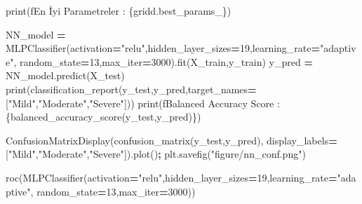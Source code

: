 \documentclass[12pt,twoside]{deuthesis}
\newenvironment{Shaded}{\begin{snugshade}}{\end{snugshade}}
\newcommand{\BuiltInTok}[1]{#1}
\newcommand{\DecValTok}[1]{\textcolor[rgb]{0.00,0.00,0.81}{#1}}
\newcommand{\NormalTok}[1]{#1}
\newcommand{\OperatorTok}[1]{\textcolor[rgb]{0.81,0.36,0.00}{\textbf{#1}}}
\newcommand{\SpecialCharTok}[1]{\textcolor[rgb]{0.00,0.00,0.00}{#1}}
\newcommand{\SpecialStringTok}[1]{\textcolor[rgb]{0.31,0.60,0.02}{#1}}
\newcommand{\StringTok}[1]{\textcolor[rgb]{0.31,0.60,0.02}{#1}}
\begin{document}
\begin{Shaded}
\begin{Highlighting}[]
\BuiltInTok{print}\NormalTok{(}\SpecialStringTok{f\textquotesingle{}En İyi Parametreler : }\SpecialCharTok{\{}\NormalTok{gridd}\SpecialCharTok{.}\NormalTok{best\_params\_}\SpecialCharTok{\}}\SpecialStringTok{\textquotesingle{}}\NormalTok{)}
\end{Highlighting}
\end{Shaded}
\begin{Shaded}
\begin{Highlighting}[]
\NormalTok{NN\_model }\OperatorTok{=}\NormalTok{ MLPClassifier(activation}\OperatorTok{=}\StringTok{"relu"}\NormalTok{,hidden\_layer\_sizes}\OperatorTok{=}\DecValTok{19}\NormalTok{,learning\_rate}\OperatorTok{=}\StringTok{"adaptive"}\NormalTok{,}
\NormalTok{                         random\_state}\OperatorTok{=}\DecValTok{13}\NormalTok{,max\_iter}\OperatorTok{=}\DecValTok{3000}\NormalTok{).fit(X\_train,y\_train)}
\NormalTok{y\_pred }\OperatorTok{=}\NormalTok{ NN\_model.predict(X\_test)}
\BuiltInTok{print}\NormalTok{(classification\_report(y\_test,y\_pred,target\_names}\OperatorTok{=}\NormalTok{[}\StringTok{"Mild"}\NormalTok{,}\StringTok{"Moderate"}\NormalTok{,}\StringTok{"Severe"}\NormalTok{]))}
\BuiltInTok{print}\NormalTok{(}\SpecialStringTok{f\textquotesingle{}Balanced Accuracy Score : }\SpecialCharTok{\{}\NormalTok{balanced\_accuracy\_score(y\_test,y\_pred)}\SpecialCharTok{\}}\SpecialStringTok{\textquotesingle{}}\NormalTok{)}
\end{Highlighting}
\end{Shaded}
\begin{Shaded}
\begin{Highlighting}[]
\NormalTok{ConfusionMatrixDisplay(confusion\_matrix(y\_test,y\_pred),}
\NormalTok{                       display\_labels}\OperatorTok{=}\NormalTok{[}\StringTok{"Mild"}\NormalTok{,}\StringTok{"Moderate"}\NormalTok{,}\StringTok{"Severe"}\NormalTok{]).plot()}\OperatorTok{;}
\NormalTok{plt.savefig(}\StringTok{"figure/nn\_conf.png"}\NormalTok{)}
\end{Highlighting}
\end{Shaded}
\begin{Shaded}
\begin{Highlighting}[]
\NormalTok{roc(MLPClassifier(activation}\OperatorTok{=}\StringTok{"relu"}\NormalTok{,hidden\_layer\_sizes}\OperatorTok{=}\DecValTok{19}\NormalTok{,learning\_rate}\OperatorTok{=}\StringTok{"adaptive"}\NormalTok{,}
\NormalTok{                  random\_state}\OperatorTok{=}\DecValTok{13}\NormalTok{,max\_iter}\OperatorTok{=}\DecValTok{3000}\NormalTok{))}
\end{Highlighting}
\end{Shaded}
\normalsize
\end{document}
